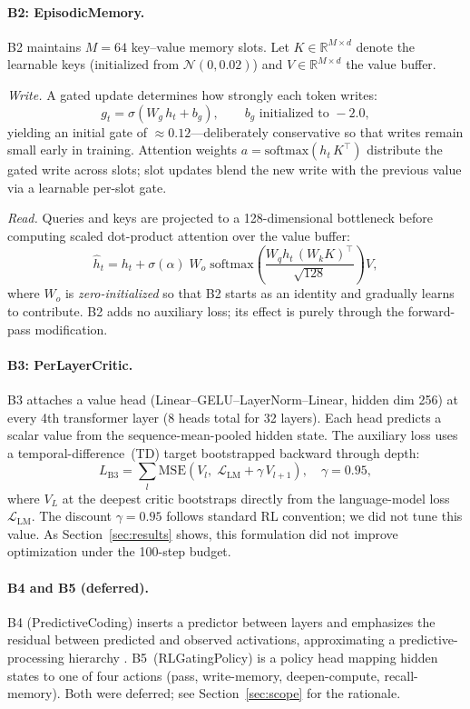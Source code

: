 \documentclass[11pt]{article}
\begin{document}
\paragraph{B2: EpisodicMemory.}
B2 maintains $M{=}64$ key--value memory slots.
Let $K \in \mathbb{R}^{M \times d}$ denote the learnable keys (initialized
from $\mathcal{N}(0,0.02)$) and $V \in \mathbb{R}^{M \times d}$ the value
buffer.

\emph{Write.}\; A gated update determines how strongly each token writes:
\[
g_t = \sigma(W_g\, h_t + b_g), \qquad b_g \text{ initialized to } {-}2.0,
\]
yielding an initial gate of ${\approx}0.12$---deliberately conservative so
that writes remain small early in training.
Attention weights $a = \mathrm{softmax}(h_t\, K^\top)$ distribute the gated
write across slots; slot updates blend the new write with the previous value
via a learnable per-slot gate.

\emph{Read.}\; Queries and keys are projected to a 128-dimensional bottleneck
before computing scaled dot-product attention over the value buffer:
\[
\hat{h}_t = h_t + \sigma(\alpha)\;
  W_o\;\mathrm{softmax}\!\!\left(\frac{W_q h_t\,(W_k K)^\top}{\sqrt{128}}\right) V,
\]
where $W_o$ is \emph{zero-initialized} so that B2 starts as an identity and
gradually learns to contribute.
B2 adds no auxiliary loss; its effect is purely through the forward-pass
modification.

\paragraph{B3: PerLayerCritic.}
B3 attaches a value head (Linear--GELU--LayerNorm--Linear, hidden dim 256) at
every 4th transformer layer (8 heads total for 32 layers).
Each head predicts a scalar value from the sequence-mean-pooled hidden state.
The auxiliary loss uses a temporal-difference~(TD) target bootstrapped backward
through depth:
\[
L_{\mathrm{B3}} = \sum_l \mathrm{MSE}\!\left(V_l,\;
  \mathcal{L}_{\mathrm{LM}} + \gamma\, V_{l+1}\right),
  \quad \gamma = 0.95,
\]
where $V_L$ at the deepest critic bootstraps directly from the language-model
loss $\mathcal{L}_{\mathrm{LM}}$.
The discount $\gamma = 0.95$ follows standard RL convention; we did not tune
this value.
As Section~\ref{sec:results} shows, this formulation did not improve
optimization under the 100-step budget.

\paragraph{B4 and B5 (deferred).}
B4 (PredictiveCoding) inserts a predictor between layers and emphasizes the
residual between predicted and observed activations, approximating a
predictive-processing hierarchy \citep{rao1999predictive}.
B5~(RLGatingPolicy) is a policy head mapping hidden states to one of four
actions (pass, write-memory, deepen-compute, recall-memory).
Both were deferred; see Section~\ref{sec:scope} for the rationale.
\end{document}
